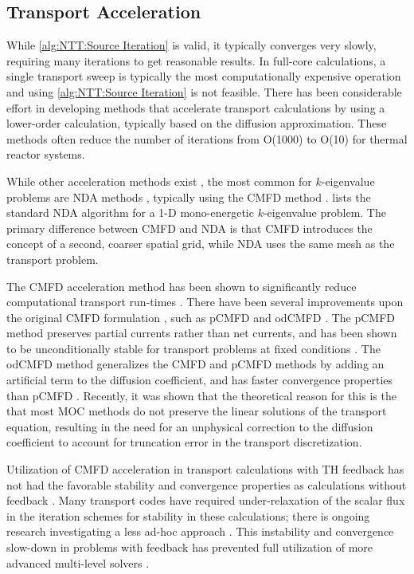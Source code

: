 {{    \subsection{Transport Acceleration}{\label{ssec:NTT:Transport Acceleration}
      While \cref{alg:NTT:Source Iteration} is valid, it typically converges very slowly, requiring many iterations to get reasonable results.
      In full-core calculations, a single transport sweep is typically the most computationally expensive operation and using \cref{alg:NTT:Source Iteration} is not feasible.
      There has been considerable effort in developing methods that accelerate transport calculations by using a lower-order calculation, typically based on the diffusion approximation.
      These methods often reduce the number of iterations from O(1000) to O(10) for thermal reactor systems.

      While other acceleration methods exist \cite{Hebert2017}, the most common for $k$-eigenvalue problems are \ac{NDA} methods \cite{Smith2002}, typically using the \ac{CMFD} method \cite{Smith1983}.
       lists the standard \ac{NDA} algorithm for a 1-D mono-energetic $k$-eigenvalue problem.
      The primary difference between \ac{CMFD} and \ac{NDA} is that \ac{CMFD} introduces the concept of a second, coarser spatial grid, while \ac{NDA} uses the same mesh as the transport problem.

      The \ac{CMFD} acceleration method has been shown to significantly reduce computational transport run-times \cite{Smith2002,Anistratov2011,Collins2016}.
      There have been several improvements upon the original \ac{CMFD} formulation \cite{Smith1983}, such as p\ac{CMFD} \cite{Cho2002} and od\ac{CMFD} \cite{Zhu2016}.
      The p\ac{CMFD} method preserves partial currents rather than net currents, and has been shown to be unconditionally stable for transport problems at fixed conditions \cite{Cho2002}.
      The od\ac{CMFD} method generalizes the \ac{CMFD} and p\ac{CMFD} methods by adding an artificial term to the diffusion coefficient, and has faster convergence properties than p\ac{CMFD} \cite{Zhu2016}.
      Recently, it was shown that the theoretical reason for this is the that most \ac{MOC} methods do not preserve the linear solutions of the transport equation, resulting in the need for an unphysical correction to the diffusion coefficient to account for truncation error in the transport discretization.

      Utilization of \ac{CMFD} acceleration in transport calculations with \ac{TH} feedback has not had the favorable stability and convergence properties as calculations without feedback \cite{Kochunas2017}.
      Many transport codes have required under-relaxation of the scalar flux in the iteration schemes for stability in these calculations; there is ongoing research investigating a less ad-hoc approach \cite{Kochunas2017}.
      This instability and convergence slow-down in problems with feedback has prevented full utilization of more advanced multi-level solvers \cite{Kochunas2017,Yee2018a}.

}}}
